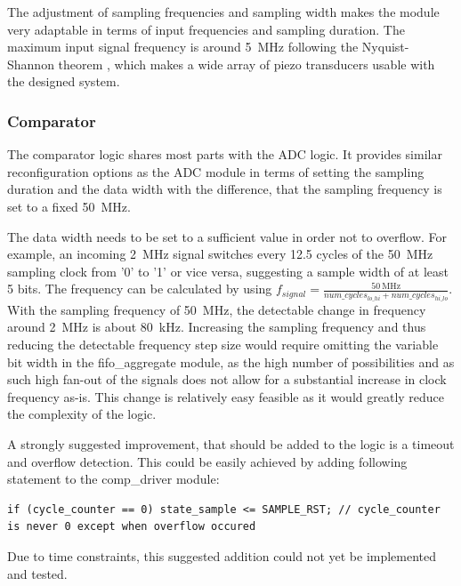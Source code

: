 \documentclass[
	english,
	ruledheaders=section, %
	class=report,%
	thesis={type=Project Seminar Report},%
	accentcolor=TUDa-1d, %
	custommargins=false,%
	marginpar=false,%
	parskip=half-,%
	fontsize=11pt,%
]{tudapub}
\begin{document}
The adjustment of sampling frequencies and sampling width makes the module very adaptable in terms of input frequencies and sampling duration. The maximum input signal frequency is around \SI{5}{\mega\hertz} following the Nyquist-Shannon theorem \cite{jerriShannonSamplingTheorem1977}, which makes a wide array of piezo transducers usable with the designed system.


\subsubsection{Comparator}
The comparator logic shares most parts with the \gls{ADC} logic. It provides similar reconfiguration options as the \gls{ADC} module in terms of setting the sampling duration and the data width with the difference, that the sampling frequency is set to a fixed \SI{50}{\mega\hertz}. 

The data width needs to be set to a sufficient value in order not to overflow. For example, an incoming \SI{2}{\mega\hertz} signal switches every 12.5 cycles of the \SI{50}{\mega\hertz} sampling clock from '0' to '1' or vice versa, suggesting a sample width of at least 5 bits. The frequency can be calculated by using $f_{signal} = \frac{\SI{50}{\mega\hertz}}{num\_cycles_{lo\_hi} + num\_cycles_{hi\_lo}}$. With the sampling frequency of \SI{50}{\mega\hertz}, the detectable change in frequency around \SI{2}{\mega\hertz} is about \SI{80}{\kilo\hertz}. Increasing the sampling frequency and thus reducing the detectable frequency step size would require omitting the variable bit width in the fifo\_aggregate module, as the high number of possibilities and as such high fan-out of the signals does not allow for a substantial increase in clock frequency as-is. This change is relatively easy feasible as it would greatly reduce the complexity of the logic.

A strongly suggested improvement, that should be added to the logic is a timeout and overflow detection. This could be easily achieved by adding following statement to the comp\_driver module:
\begin{lstlisting}[firstnumber=536]
if (cycle_counter == 0) state_sample <= SAMPLE_RST; // cycle_counter is never 0 except when overflow occured
\end{lstlisting}
Due to time constraints, this suggested addition could not yet be implemented and tested.
\end{document}
